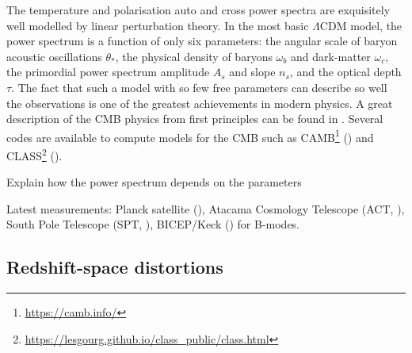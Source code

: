     The temperature and polarisation auto and cross power spectra 
    are exquisitely well modelled by linear perturbation theory. 
    In the most basic $\Lambda$CDM model, the power spectrum is a 
    function of only six parameters: the angular scale of baryon 
    acoustic oscillations $\theta_*$, 
    the physical density of baryons $\omega_b$ and dark-matter $\omega_c$, 
    the primordial power spectrum amplitude $A_s$ and slope $n_s$, 
    and the optical depth $\tau$. 
    The fact that such a model with so few free parameters can 
    describe so well the observations is one of the greatest achievements 
    in modern physics. A great description of the CMB physics 
    from first principles can be found in \cite{dodelsonscottModernCosmology2nd2020}.
    Several codes are available to compute models for the CMB 
    such as \textsc{CAMB}\footnote{\url{https://camb.info/}} 
    (\cite{lewisEfficientComputationCosmic2000})
    and \textsc{CLASS}\footnote{\url{https://lesgourg.github.io/class_public/class.html}} 
    (\cite{lesgourguesCosmicLinearAnisotropy2011}). 
    
    Explain how the power spectrum depends on the parameters
    
    Latest measurements: 
    Planck satellite (\cite{planckcollaborationPlanck2018Results2020}), 
    Atacama Cosmology Telescope (ACT, \cite{aiolaAtacamaCosmologyTelescope2020}), 
    South Pole Telescope (SPT, \cite{aylorComparisonCosmologicalParameters2017, 
    balkenholConstraintsLambdaCDM2021, dutcherMeasurementsEModePolarization2021}),
    BICEP/Keck (\cite{bicep/keckDemonstrationImprovedConstraints2021}) for B-modes. 
    




 

    \subsection{Redshift-space distortions}
    \label{intro:probes:rsd}

